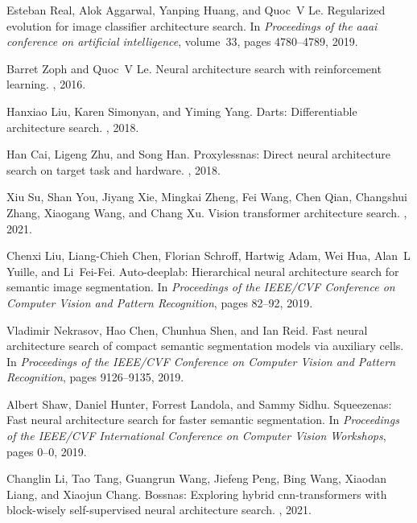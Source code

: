 \documentclass{article}
\begin{document}
\begin{thebibliography}{10}

Esteban Real, Alok Aggarwal, Yanping Huang, and Quoc~V Le.
\newblock Regularized evolution for image classifier architecture search.
\newblock In {\em Proceedings of the aaai conference on artificial
  intelligence}, volume~33, pages 4780--4789, 2019.

Barret Zoph and Quoc~V Le.
\newblock Neural architecture search with reinforcement learning.
, 2016.

Hanxiao Liu, Karen Simonyan, and Yiming Yang.
\newblock Darts: Differentiable architecture search.
, 2018.

Han Cai, Ligeng Zhu, and Song Han.
\newblock Proxylessnas: Direct neural architecture search on target task and
  hardware.
, 2018.

Xiu Su, Shan You, Jiyang Xie, Mingkai Zheng, Fei Wang, Chen Qian, Changshui
  Zhang, Xiaogang Wang, and Chang Xu.
\newblock Vision transformer architecture search.
, 2021.

Chenxi Liu, Liang-Chieh Chen, Florian Schroff, Hartwig Adam, Wei Hua, Alan~L
  Yuille, and Li~Fei-Fei.
\newblock Auto-deeplab: Hierarchical neural architecture search for semantic
  image segmentation.
\newblock In {\em Proceedings of the IEEE/CVF Conference on Computer Vision and
  Pattern Recognition}, pages 82--92, 2019.

Vladimir Nekrasov, Hao Chen, Chunhua Shen, and Ian Reid.
\newblock Fast neural architecture search of compact semantic segmentation
  models via auxiliary cells.
\newblock In {\em Proceedings of the IEEE/CVF Conference on Computer Vision and
  Pattern Recognition}, pages 9126--9135, 2019.

Albert Shaw, Daniel Hunter, Forrest Landola, and Sammy Sidhu.
\newblock Squeezenas: Fast neural architecture search for faster semantic
  segmentation.
\newblock In {\em Proceedings of the IEEE/CVF International Conference on
  Computer Vision Workshops}, pages 0--0, 2019.

Changlin Li, Tao Tang, Guangrun Wang, Jiefeng Peng, Bing Wang, Xiaodan Liang,
  and Xiaojun Chang.
\newblock Bossnas: Exploring hybrid cnn-transformers with block-wisely
  self-supervised neural architecture search.
, 2021.


\end{thebibliography}
\end{document}
